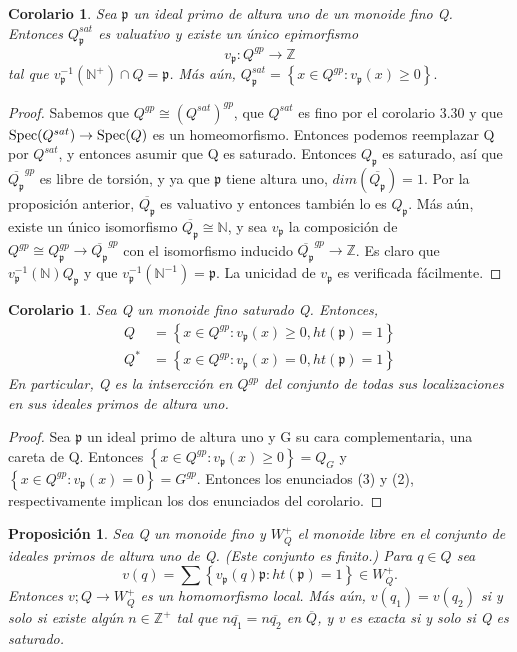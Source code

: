 \documentclass[12pt,spanish]{amsart}
\newcommand{\bb}[1]{\mathbb{#1}}
\newcommand{\fk}[1]{\mathfrak{#1}}
\newcommand{\set}[1]{\left\{{#1}\right\}}
\def\Spec{\mathop{\mbox{\normalfont Spec}}\nolimits}
\newtheorem{prop}[Theorem]{Proposición}
\newtheorem{cor}[Theorem]{Corolario}
\theoremstyle{definition}
\theoremstyle{remark}
\begin{document}
\begin{cor}
Sea $\fk{p}$ un ideal primo de altura uno de un monoide fino Q. Entonces $Q^{sat}_{\fk{p}}$ es valuativo y existe un único epimorfismo
$$v_{\fk{p}}:Q^{gp} \to \bb{Z}$$
tal que $v_{\fk{p}}^{-1}(\bb{N}^{+})\cap Q =\fk{p}$. Más aún, $Q^{sat}_{\fk{p}}=\set{x\in Q^{gp}: v_{\fk{p}}(x)\geq 0}.$ 
\end{cor}

\begin{proof}
Sabemos que $Q^{gp}\cong (Q^{sat})^{gp}$, que $Q^{sat}$ es fino por el corolario 3.30 y que $\Spec(Q^{sat}) \to \Spec(Q)$ es un homeomorfismo. Entonces podemos reemplazar Q por $Q^{sat}$, y entonces asumir que Q es saturado. Entonces $Q_{\fk{p}}$ es saturado, así que $\overline{Q_{\fk{p}}}^{gp}$ es libre de torsión, y ya que $\fk{p}$ tiene altura uno, $dim(\overline{Q_{\fk{p}}})=1$. Por la proposición anterior, $\overline{Q_{\fk{p}}}$ es valuativo y entonces también lo es $Q_{\fk{p}}$. Más aún, existe un único isomorfismo $\overline{Q_{\fk{p}}}\cong \bb{N}$, y sea $v_{\fk{p}}$ la composición de $Q^{gp}\cong Q_{\fk{p}}^{gp} \to \overline{Q_{\fk{p}}}^{gp}$ con el isomorfismo inducido $\overline{Q_{\fk{p}}}^{gp} \to \bb{Z}$. Es claro que $v_{\fk{p}}^{-1}(\bb{N})Q_{\fk{p}}$ y que $v_{\fk{p}}^{-1}(\bb{N}^{-1})=\fk{p}$. La unicidad de $v_{\fk{p}}$ es verificada fácilmente.   
\end{proof}


\begin{cor}
Sea Q un monoide fino saturado Q. Entonces,
\begin{equation*}
\begin{split}
Q &= \set{x\in Q^{gp}:v_{\fk{p}}(x)\geq 0,ht(\fk{p})=1} \\
Q^{\ast} &= \set{x\in Q^{gp}:v_{\fk{p}}(x) = 0,ht(\fk{p})=1} 
\end{split}
\end{equation*}
En particular, Q es la intsercción en $Q^{gp}$ del conjunto de todas sus localizaciones en sus ideales primos de altura uno.
\end{cor}

\begin{proof}
Sea $\fk{p}$ un ideal primo de altura uno y G su cara complementaria, una careta de Q. Entonces $\set{x\in Q^{gp}:v_{\fk{p}}(x)\geq 0}=Q_{G}$ y $\set{x\in Q^{gp}:v_{\fk{p}}(x)=0}=G^{gp}$. Entonces los enunciados (3) y (2), respectivamente implican los dos enunciados del corolario.  
\end{proof}

\begin{prop}
Sea Q un monoide fino y $W_{Q}^{+}$ el monoide libre en el conjunto de ideales primos de altura uno de Q. (Este conjunto es finito.) Para $q\in Q$ sea
$$v(q)=\sum \set{v_{\fk{p}}(q) \fk{p}: ht(\fk{p})=1}\in W_{Q}^{+}.$$
Entonces $v;Q \to W_{Q}^{+}$ es un homomorfismo local. Más aún, $v(q_{1})=v(q_{2})$ si y solo si existe algún $n\in \bb{Z}^{+}$ tal que $n\overline{q_{1}}=n\overline{q_{2}}$ en $\overline{Q}$, y v es exacta si y solo si Q es saturado.  
\end{prop}
\end{document}
